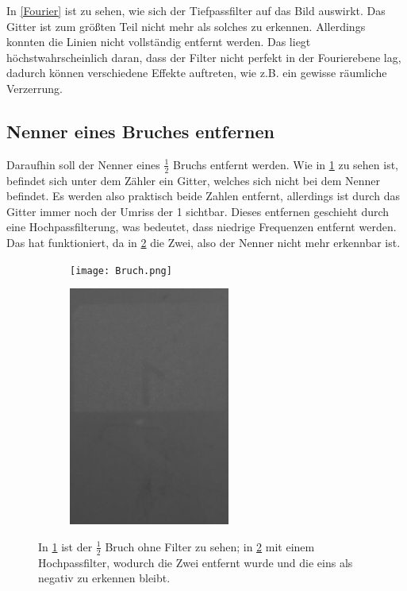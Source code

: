 In \cref{Fourier} ist zu sehen, wie sich der Tiefpassfilter auf das Bild auswirkt. Das Gitter ist zum größten Teil nicht mehr als solches zu erkennen. Allerdings konnten die Linien nicht vollständig entfernt werden. Das liegt höchstwahrscheinlich daran, dass der Filter nicht perfekt in der Fourierebene lag, dadurch können verschiedene Effekte auftreten, wie z.B. ein gewisse räumliche Verzerrung. 

\subsection{Nenner eines Bruches entfernen}
Daraufhin soll der Nenner eines $\frac{1}{2}$ Bruchs entfernt werden. Wie in \cref{fig:Bruch} zu sehen ist, befindet sich unter dem Zähler ein Gitter, welches sich nicht bei dem Nenner befindet. Es werden also praktisch beide Zahlen entfernt, allerdings ist durch das Gitter immer noch der Umriss der 1 sichtbar. Dieses entfernen geschieht durch eine Hochpassfilterung, was bedeutet, dass niedrige Frequenzen entfernt werden. Das hat funktioniert, da in \cref{fig:Bruch_filter} die Zwei, also der Nenner nicht mehr erkennbar ist.

\begin{figure}[h]
	\begin{subfigure}[c]{0.5\textwidth}
		
		\texttt{[image: Bruch.png]}
		\caption{}
		\label{fig:Bruch}
		
	\end{subfigure}
	\begin{subfigure}[c]{0.5\textwidth}
		\includegraphics[width=0.58\textwidth]{Filter_Bruch.png}
		\caption{}
		\label{fig:Bruch_filter}
	\end{subfigure}
	\caption{In \cref{fig:Bruch} ist der $\frac{1}{2}$ Bruch ohne Filter zu sehen; in \cref{fig:Bruch_filter} mit einem Hochpassfilter, wodurch die Zwei entfernt wurde und die eins als negativ zu erkennen bleibt.}
	\label{Bruch}
\end{figure}   

